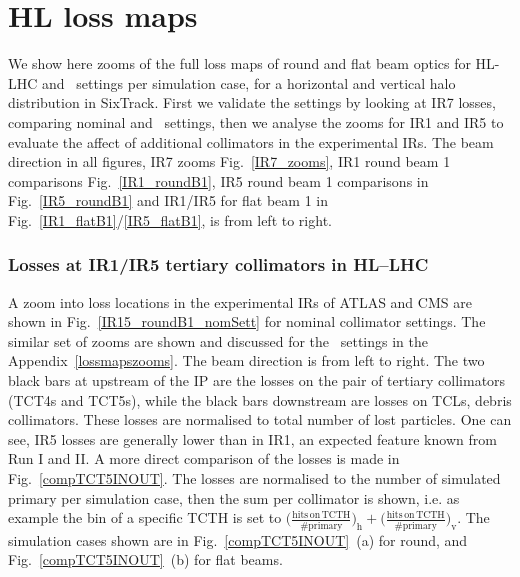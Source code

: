 \section{HL loss maps \label{lossmapszooms}}

We show here zooms of the full loss maps of round and flat beam optics for HL-LHC and \twosigmaret~settings per simulation case, for a horizontal and vertical halo distribution in SixTrack. First we validate the settings by looking at IR7 losses, comparing nominal and \twosigmaret~settings, then we analyse the zooms for IR1 and IR5 to evaluate the affect of additional collimators in the experimental IRs. The beam direction in all figures, IR7 zooms Fig.~\ref{IR7_zooms}, IR1 round beam 1 comparisons Fig.~\ref{IR1_roundB1}, IR5 round beam 1 comparisons in Fig.~\ref{IR5_roundB1} and IR1/IR5 for flat beam 1 in Fig.~\ref{IR1_flatB1}/\ref{IR5_flatB1}, is from left to right. 

\subsubsection{Losses at IR1/IR5 tertiary collimators in HL--LHC}

A zoom into loss locations in the experimental IRs of ATLAS and CMS are shown in Fig.~\ref{IR15_roundB1_nomSett} for nominal collimator settings. The similar set of zooms are shown and discussed for the \twosigmaret~settings in the Appendix~\ref{lossmapszooms}. The beam direction is from left to right. The two black bars at upstream of the IP are the losses on the pair of tertiary collimators (TCT4s and TCT5s), while the black bars downstream are losses on TCLs, debris collimators. These losses are normalised to total number of lost particles. One can see, IR5 losses are generally lower than in IR1, an expected feature known from Run I and II. A more direct comparison of the losses is made in Fig.~\ref{compTCT5INOUT}. The losses are normalised to the number of simulated primary per simulation case, then the sum per collimator is shown, i.e. as example the bin of a specific TCTH is set to $\big(\frac{\mathrm{hits\,on\,TCTH}}{\#\mathrm{primary}}\big)_{\mathrm{h}} + \big(\frac{\mathrm{hits\,on\,TCTH}}{\#\mathrm{primary}}\big)_{\mathrm{v}}$. The simulation cases shown are in Fig.~\ref{compTCT5INOUT}~(a) for round, and Fig.~\ref{compTCT5INOUT}~(b) for flat beams.

